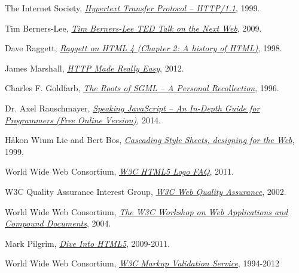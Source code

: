 \renewcommand{\bibname}{References}
\begin{thebibliography}{99}

  The Internet Society,
  \emph{\href{http://tools.ietf.org/html/rfc2616}{Hypertext Transfer Protocol -- HTTP/1.1}},  
  1999.

  Tim Berners-Lee,
  \emph{\href{http://www.ted.com/talks/tim_berners_lee_on_the_next_web?language=en}{Tim Berners-Lee TED Talk on the Next Web}},  
  2009.

  Dave Raggett,
  \emph{\href{http://www.w3.org/People/Raggett/book4/ch02.html}{Raggett on HTML 4 (Chapter 2: A history of HTML)}},  
  1998.

  James Marshall,
  \emph{\href{http://www.jmarshall.com/easy/http/}{HTTP Made Really Easy}},  
  2012.
  
Charles F. Goldfarb,
\emph{\href{http://www.sgmlsource.com/history/roots.htm}{The Roots of SGML -- A Personal Recollection}},  
1996.

Dr. Axel Rauschmayer,
\emph{\href{http://speakingjs.com/es5/}{Speaking JavaScript -- An In-Depth Guide for Programmers (Free Online Version)}},  
2014.

Håkon Wium Lie and Bert Bos,
\emph{\href{http://www.w3.org/Style/LieBos2e/history/Overview.html}{Cascading Style Sheets, designing for the Web}},  
1999.

World Wide Web Consortium,
\emph{\href{http://www.w3.org/html/logo/faq.html}{W3C HTML5 Logo FAQ}},  
2011.

W3C Quality Assurance Interest Group,
\emph{\href{http://www.w3.org/QA/2002/04/Web-Quality}{W3C Web Quality Assurance}},  
2002.

World Wide Web Consortium,
\emph{\href{http://www.w3.org/2004/04/webapps-cdf-ws/}{The W3C Workshop on Web Applications and Compound Documents}},  
2004.

Mark Pilgrim,
\emph{\href{http://diveintohtml5.info/index.html}{Dive Into HTML5}},  
2009-2011.

World Wide Web Consortium,
\emph{\href{https://validator.w3.org/}{W3C Markup Validation Service}},  
1994-2012


\end{thebibliography}
